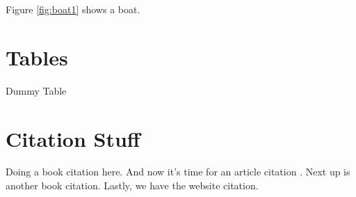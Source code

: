 \documentclass{article}
\begin{document}
    Figure \ref{fig:boat1} shows a boat.

  \section{Tables}
    \begin{table}
      \caption{Dummy Table}
    \end{table}

  \section{Citation Stuff}
    Doing a book citation \autocite[31]{BOOK:1} here.
    And now it's time for an article citation \autocite[697]{ARTICLE:1}.
    Next up is another book \autocite[155]{BOOK:2} citation.
    Lastly, we have the website \autocite[]{WEBSITE:1} citation.


  \newpage
  \printbibliography

  \newpage
  \newpage
  \begin{appendix}
    \listoffigures
    \listoftables
  \end{appendix}
\end{document}
